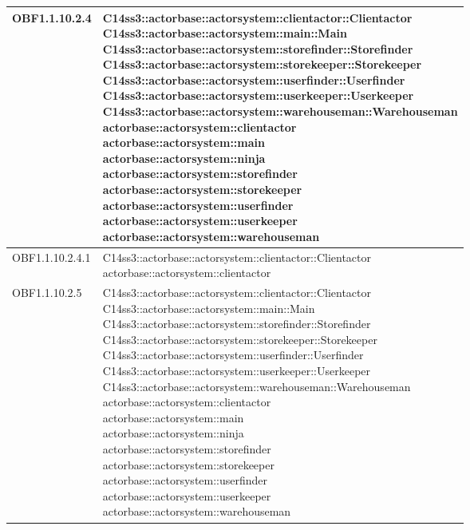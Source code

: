 \documentclass{scalatekids-article}
\begin{document}
\begin{longtable}[H]{|p{4.5cm}|p{13cm}|}
OBF1.1.10.2.4 & \multiLineCell[t]{C14ss3::actorbase::actorsystem::clientactor::Clientactor\\C14ss3::actorbase::actorsystem::main::Main\\C14ss3::actorbase::actorsystem::storefinder::Storefinder\\C14ss3::actorbase::actorsystem::storekeeper::Storekeeper\\C14ss3::actorbase::actorsystem::userfinder::Userfinder\\C14ss3::actorbase::actorsystem::userkeeper::Userkeeper\\C14ss3::actorbase::actorsystem::warehouseman::Warehouseman\\actorbase::actorsystem::clientactor\\actorbase::actorsystem::main\\actorbase::actorsystem::ninja\\actorbase::actorsystem::storefinder\\actorbase::actorsystem::storekeeper\\actorbase::actorsystem::userfinder\\actorbase::actorsystem::userkeeper\\actorbase::actorsystem::warehouseman\\}\\
\hline
OBF1.1.10.2.4.1 & \multiLineCell[t]{C14ss3::actorbase::actorsystem::clientactor::Clientactor\\actorbase::actorsystem::clientactor\\}\\
\hline
OBF1.1.10.2.5 & \multiLineCell[t]{C14ss3::actorbase::actorsystem::clientactor::Clientactor\\C14ss3::actorbase::actorsystem::main::Main\\C14ss3::actorbase::actorsystem::storefinder::Storefinder\\C14ss3::actorbase::actorsystem::storekeeper::Storekeeper\\C14ss3::actorbase::actorsystem::userfinder::Userfinder\\C14ss3::actorbase::actorsystem::userkeeper::Userkeeper\\C14ss3::actorbase::actorsystem::warehouseman::Warehouseman\\actorbase::actorsystem::clientactor\\actorbase::actorsystem::main\\actorbase::actorsystem::ninja\\actorbase::actorsystem::storefinder\\actorbase::actorsystem::storekeeper\\actorbase::actorsystem::userfinder\\actorbase::actorsystem::userkeeper\\actorbase::actorsystem::warehouseman\\}\\

\end{longtable}
\end{document}
